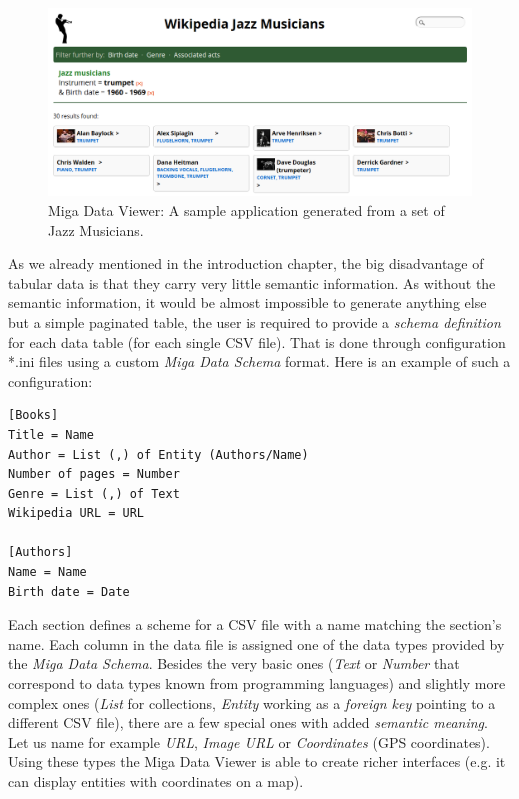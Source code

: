 \begin{figure}
	\centering
	\includegraphics[width=140mm]{img/02_miga_data_viewer.png}
	\caption{Miga Data Viewer: A sample application generated from a set of Jazz Musicians.}
	\label{fig:miga-data-viewer}
\end{figure}

As we already mentioned in the introduction chapter, the big disadvantage of tabular data is that they carry very little semantic information. As without the semantic information, it would be almost impossible to generate anything else but a simple paginated table, the user is required to provide a \emph{schema definition} for each data table (for each single CSV file). That is done through configuration *.ini files using a custom \emph{Miga Data Schema} format. Here is an example of such a configuration:

\scriptsize
\begin{verbatim}
[Books]
Title = Name
Author = List (,) of Entity (Authors/Name)
Number of pages = Number
Genre = List (,) of Text
Wikipedia URL = URL

[Authors]
Name = Name
Birth date = Date
\end{verbatim}
\normalsize

Each section defines a scheme for a CSV file with a name matching the section's name. Each column in the data file is assigned one of the data types provided by the \emph{Miga Data Schema}. Besides the very basic ones (\emph{Text} or \emph{Number} that correspond to data types known from programming languages) and slightly more complex ones (\emph{List} for collections, \emph{Entity} working as a \emph{foreign key} pointing to a different CSV file), there are a few special ones with added \emph{semantic meaning}. Let us name for example \emph{URL}, \emph{Image URL} or \emph{Coordinates} (GPS coordinates). Using these types the Miga Data Viewer is able to create richer interfaces (e.g. it can display entities with coordinates on a map).

